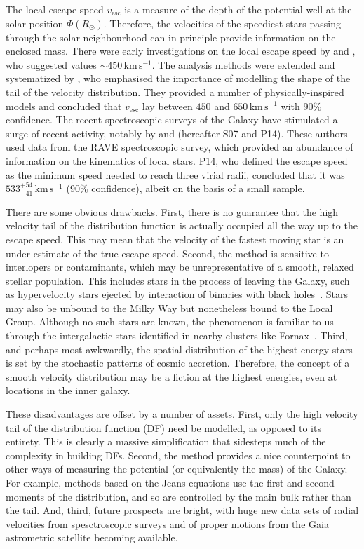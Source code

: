 \documentclass[useAMS,twocolumn,usenatbib]{mn2e}
\def\kms{{\,\mathrm{km\,s^{-1}}}}
\def\vesc{{v_\mathrm{esc}}}
\begin{document}
The local escape speed $\vesc$ is a measure of the depth of the potential well at the solar position $\Phi(R_\odot)$. 
Therefore, the velocities of the speediest stars passing through the solar neighbourhood can in principle provide information on the enclosed mass. 
There were early investigations on the local escape speed by \citet{Ca81} and \citet{Al82}, who suggested values $\sim 450\kms$.
The analysis methods were extended and systematized by \citet{Le90}, who emphasised the importance of modelling the shape of the tail of the velocity distribution. 
They provided a number of physically-inspired models and concluded that $\vesc$ lay between $450$ and $650 \kms$ with 90\% confidence. 
The recent spectroscopic surveys of the Galaxy have stimulated a surge of recent activity, notably by \cite{Sm07} and \cite{Pi14} (hereafter S07 and P14).
These authors used data from the RAVE spectroscopic survey, which provided an abundance of information on the kinematics of local stars. 
P14, who defined the escape speed as the minimum speed needed to reach three virial radii, concluded that it was $533^{+54}_{-41} \kms$ (90\% confidence), albeit on the basis of a small sample.

There are some obvious drawbacks. First, there is no guarantee that the high velocity tail of the distribution function is actually occupied all the way up to the escape speed. 
This may mean that the velocity of the fastest moving star is an under-estimate of the true escape speed. 
Second, the method is sensitive to interlopers or contaminants, which may be unrepresentative of a smooth, relaxed stellar population. 
This includes stars in the process of leaving the Galaxy, such as hypervelocity stars ejected by interaction of binaries with black holes~\citep[e.g.,][]{Br15,Bou16}. 
Stars may also be unbound to the Milky Way but nonetheless bound to the Local Group. 
Although no such stars are known, the phenomenon is familiar to us through the intergalactic stars identified in nearby clusters like Fornax~\citep{Th97}. 
Third, and perhaps most awkwardly, the spatial distribution of the highest energy stars is set by the stochastic patterns of cosmic accretion. 
Therefore, the concept of a smooth velocity distribution may be a fiction at the highest energies, even at locations in the inner galaxy.

These disadvantages are offset by a number of assets. First, only the high velocity tail of the distribution function (DF) need be modelled, as opposed to its entirety. 
This is clearly a massive simplification that sidesteps much of the complexity in building DFs. 
Second, the method provides a nice counterpoint to other ways of measuring the potential (or equivalently the mass) of the Galaxy. 
For example, methods based on the Jeans equations use the first and second moments of the distribution, and so are controlled by the main bulk rather than the tail. 
And, third, future prospects are bright, with huge new data sets of radial velocities from spesctroscopic surveys and of proper motions from the Gaia astrometric satellite becoming available.
\end{document}
